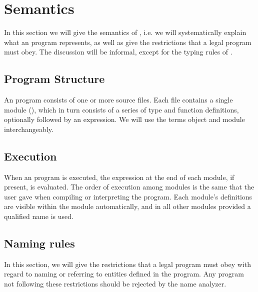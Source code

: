 \section{Semantics}
In this section we will give the semantics of \langname, i.e. we
will systematically explain what an \langname program represents,
as well as give the restrictions that a legal \langname program must obey.
The discussion will be informal, except for the typing rules
of \langname.


\subsection{Program Structure}
An \langname program consists of one or more source files.
Each file contains a single module (),
which in turn consists of a series of type and function definitions,
optionally followed by an expression.
We will use the terms object and module interchangeably.

\subsection{Execution}
When an \langname program is executed,
the expression at the end of each module, if present, is evaluated.
The order of execution among modules is the same that the user gave
when compiling or interpreting the program.
Each module's definitions are visible within the module automatically,
and in all other modules provided a qualified name is used.

\subsection{Naming rules}
In this section, we will give the restrictions that a legal \langname program
must obey with regard to naming or referring to entities defined in the program.
Any program not following these restrictions should be rejected by the \langname
name analyzer.

